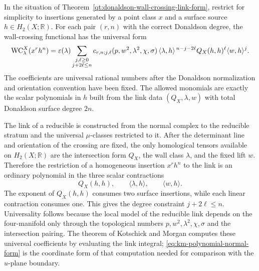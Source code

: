 \begin{remark}
\label{rem:kotschick-morgan-polynomial-normal-form}
In the situation of
Theorem~\ref{qt:donaldson-wall-crossing-link-form}, restrict for simplicity to
insertions generated by a point class \(x\) and a surface source
\(h\in H_2(X;\mathbb R)\).  For each pair \((r,n)\) with the correct
Donaldson degree, the wall-crossing functional has the universal form
\begin{equation}
  {\rm WC}_\lambda^X(x^r h^n)
  =
  \varepsilon(\lambda)
  \sum_{\substack{j,\ell\ge0\\j+2\ell\le n}}
  c_{r,n;j,\ell}(p,w^2,\lambda^2,\chi,\sigma)\,
  \langle \lambda,h\rangle^{\,n-j-2\ell}
  Q_X(h,h)^\ell
  \langle w,h\rangle^j .
  \label{eq:km-polynomial-normal-form}
\end{equation}
The coefficients are universal rational numbers after the Donaldson
normalization and orientation convention have been fixed.  The allowed
monomials are exactly the scalar polynomials in \(h\) built from the link data
\((Q_X,\lambda,w)\) with total Donaldson surface degree \(2n\).

The link of a reducible is constructed from the normal complex to the
reducible stratum and the universal \(\mu\)-classes restricted to it.  After
the determinant line and orientation of the crossing are fixed, the only
homological tensors available on \(H_2(X;\mathbb R)\) are the intersection
form \(Q_X\), the wall class \(\lambda\), and the fixed lift \(w\).  Therefore
the restriction of a homogeneous insertion \(x^r h^n\) to the link is an
ordinary polynomial in the three scalar contractions
\[
  Q_X(h,h),\qquad \langle\lambda,h\rangle,\qquad \langle w,h\rangle .
\]
The exponent of \(Q_X(h,h)\) consumes two surface insertions, while each
linear contraction consumes one.  This gives the degree constraint
\(j+2\ell\le n\).  Universality follows because the local model of the
reducible link depends on the four-manifold only through the topological
numbers \(p,w^2,\lambda^2,\chi,\sigma\) and the intersection pairing.  The
theorem of Kotschick and Morgan computes these universal coefficients by
evaluating the link integral; \eqref{eq:km-polynomial-normal-form} is the
coordinate form of that computation needed for comparison with the
\(u\)-plane boundary.
\end{remark}


